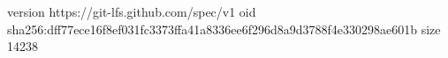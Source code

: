 version https://git-lfs.github.com/spec/v1
oid sha256:dff77ece16f8ef031fc3373ffa41a8336ee6f296d8a9d3788f4e330298ae601b
size 14238
